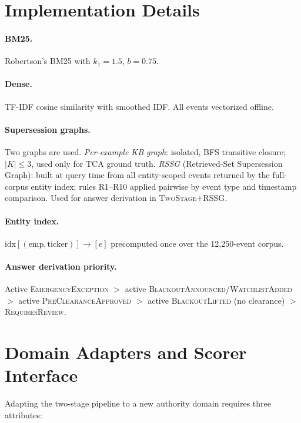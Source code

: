 \documentclass[11pt]{article}
\newcommand{\sysplus}{\textsc{TwoStage+RSSG}}
\begin{document}
\section{Implementation Details}
\label{app:impl}

\paragraph{BM25.} Robertson's BM25 \cite{robertson1994bm25} with $k_1 = 1.5$, $b = 0.75$.

\paragraph{Dense.} TF-IDF cosine similarity with smoothed IDF. All events vectorized offline.

\paragraph{Supersession graphs.} Two graphs are used. \emph{Per-example KB graph}: isolated, BFS transitive closure; $|K| \leq 3$, used only for TCA ground truth. \emph{RSSG} (Retrieved-Set Supersession Graph): built at query time from all entity-scoped events returned by the full-corpus entity index; rules R1--R10 applied pairwise by event type and timestamp comparison. Used for answer derivation in \sysplus{}.

\paragraph{Entity index.} $\text{idx}[(\text{emp}, \text{ticker})] \to [e]$ precomputed once over the 12,250-event corpus.

\paragraph{Answer derivation priority.}
Active \textsc{EmergencyException} $>$ active \textsc{BlackoutAnnounced}/\textsc{WatchlistAdded} $>$ active \textsc{PreClearanceApproved} $>$ active \textsc{BlackoutLifted} (no clearance) $>$ \textsc{RequiresReview}.

\section{Domain Adapters and Scorer Interface}
\label{app:framework}

Adapting the two-stage pipeline to a new authority domain requires three attributes:
\end{document}
